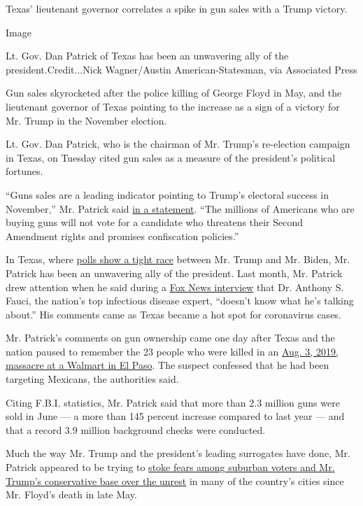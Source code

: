 Texas' lieutenant governor correlates a spike in gun sales with a Trump
victory.

Image

Lt. Gov. Dan Patrick of Texas has been an unwavering ally of the
president.Credit...Nick Wagner/Austin American-Statesman, via Associated
Press

Gun sales skyrocketed after the police killing of George Floyd in May,
and the lieutenant governor of Texas pointing to the increase as a sign
of a victory for Mr. Trump in the November election.

Lt. Gov. Dan Patrick, who is the chairman of Mr. Trump's re-election
campaign in Texas, on Tuesday cited gun sales as a measure of the
president's political fortunes.

``Guns sales are a leading indicator pointing to Trump's electoral
success in November,'' Mr. Patrick said
\href{https://www.scribd.com/document/471381594/PR-20-08-04}{in a
statement}. ``The millions of Americans who are buying guns will not
vote for a candidate who threatens their Second Amendment rights and
promises confiscation policies.''

In Texas, where
\href{https://projects.fivethirtyeight.com/polls/texas/}{polls show a
tight race} between Mr. Trump and Mr. Biden, Mr. Patrick has been an
unwavering ally of the president. Last month, Mr. Patrick drew attention
when he said during a
\href{https://video.foxnews.com/v/6168445167001\#sp=show-clips}{Fox News
interview} that Dr. Anthony S. Fauci, the nation's top infectious
disease expert, ``doesn't know what he's talking about.'' His comments
came as Texas became a hot spot for coronavirus cases.

Mr. Patrick's comments on gun ownership came one day after Texas and the
nation paused to remember the 23 people who were killed in an
\href{https://www.nytimes.com/2019/08/09/us/el-paso-suspect-confession.html}{Aug.
3, 2019, massacre at a Walmart in El Paso}. The suspect confessed that
he had been targeting Mexicans, the authorities said.

Citing F.B.I. statistics, Mr. Patrick said that more than 2.3 million
guns were sold in June --- a more than 145 percent increase compared to
last year --- and that a record 3.9 million background checks were
conducted.

Much the way Mr. Trump and the president's leading surrogates have done,
Mr. Patrick appeared to be trying to
\href{https://www.nytimes.com/2020/07/30/upshot/trump-suburban-voters.html}{stoke
fears among suburban voters and Mr. Trump's conservative base over the
unrest} in many of the country's cities since Mr. Floyd's death in late
May.

